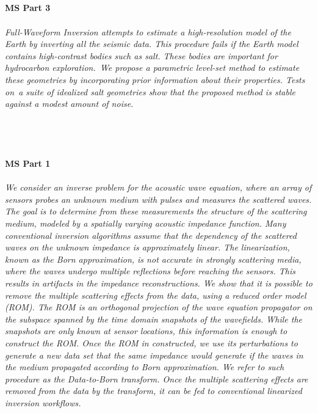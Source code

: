 \begin{multicols}{2}
\\ 
    \\
    \\\\
    \noindent\textbf{MS Part 3}\\
\\  
    \textit{Full-Waveform Inversion attempts to estimate a high-resolution model of the Earth by inverting all the seismic data. This procedure fails if the Earth model contains high-contrast bodies such as salt. These bodies are important for hydrocarbon exploration. We propose a parametric level-set method to estimate these geometries by incorporating prior information about their properties. Tests on a suite of idealized salt geometries show that the proposed method is stable against a modest amount of noise.}\\
\\ 
    \\
    \\\\
    \noindent\textbf{MS Part 1}\\
\\  
    \textit{We consider an inverse problem for the acoustic wave equation, where an array of sensors probes an unknown medium with pulses and measures the scattered waves. The goal is to determine from these measurements the structure of the scattering medium, modeled by a spatially varying acoustic impedance function. Many conventional inversion algorithms assume that the dependency of the scattered waves on the unknown impedance is approximately linear. The linearization, known as the Born approximation, is not accurate in strongly scattering media, where the waves undergo multiple reflections before reaching the sensors. This results in artifacts in the impedance reconstructions. We show that it is possible to remove the multiple scattering effects from the data, using a reduced order model (ROM). The ROM is an orthogonal projection of the wave equation propagator on the subspace spanned by the time domain snapshots of the wavefields. While the snapshots are only known at sensor locations, this information is enough to construct the ROM. Once the ROM in constructed, we use its perturbations to generate a new data set that the same impedance would generate if the waves in the medium propagated according to Born approximation. We refer to such procedure as the Data-to-Born transform. Once the multiple scattering effects are removed from the data by the transform, it can be fed to conventional linearized inversion workflows.}\\

\end{multicols}
